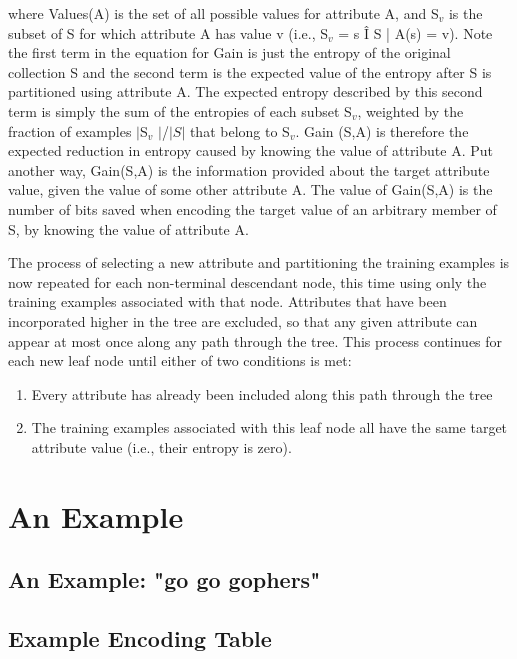 \documentclass[12pt]{report}
\begin{document}
where Values(A) is the set of all possible values for attribute A, and S$_{v}$ is the subset of S for which attribute A has value v (i.e., S$_{v}$ = {s Î S | A(s) = v}). Note the first term in the equation for Gain is just the entropy of the original collection S and the second term is the expected value of the entropy after S is partitioned using attribute A. The expected entropy described by this second term is simply the sum of the entropies of each subset S$_{v}$, weighted by the fraction of examples $|$S$_{v}$ $|$/$|S|$ that belong to S$_{v}$. Gain (S,A) is therefore the expected reduction in entropy caused by knowing the value of attribute A. Put another way, Gain(S,A) is the information provided about the target attribute value, given the value of some other attribute A. The value of Gain(S,A) is the number of bits saved when encoding the target value of an arbitrary member of S, by knowing the value of attribute A.

The process of selecting a new attribute and partitioning the training examples is now repeated for each non-terminal descendant node, this time using only the training examples associated with that node. Attributes that have been incorporated higher in the tree are excluded, so that any given attribute can appear at most once along any path through the tree. This process continues for each new leaf node until either of two conditions is met:

\begin{enumerate}
\item{Every attribute has already been included along this path through the tree}
\item{The training examples associated with this leaf node all have the same target attribute value (i.e., their entropy is zero).} 

\end{enumerate}


\section{An Example}

\subsection{An Example: "go go gophers"}


\subsection{Example Encoding Table}
\end{document}
